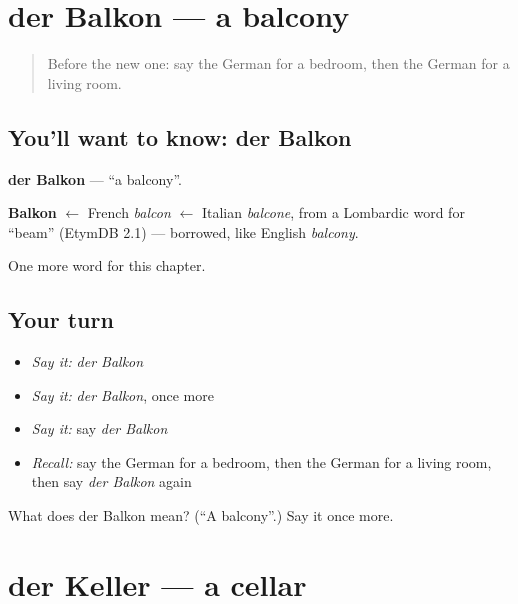 \section[der Balkon]{der Balkon — a balcony}

\label{lesson:GE-C161-balkon}



\begin{quote}
Before the new one: say the German for a bedroom, then the German for a living room.
\end{quote}

\subsection*{You'll want to know: der Balkon}
\textbf{der Balkon} — \textquotedblleft{}a balcony\textquotedblright{}.

\begin{cousinweb}
\textbf{Balkon} $\leftarrow$ French \emph{balcon} $\leftarrow$ Italian \emph{balcone}, from a Lombardic word for \textquotedblleft{}beam\textquotedblright{} (EtymDB 2.1) — borrowed, like English \emph{balcony}.
\end{cousinweb}

\begin{grammarlens}[title={What you've built}]
One more word for this chapter.
\end{grammarlens}

\subsection*{Your turn}
\begin{itemize}
\raggedright
  \item \emph{Say it:} \emph{der Balkon}
  \item \emph{Say it:} \emph{der Balkon}, once more
  \item \emph{Say it:} say \emph{der Balkon}
  \item \emph{Recall:} say the German for a bedroom, then the German for a living room, then say \emph{der Balkon} again
\end{itemize}

\begin{tcolorbox}[breakable,colback=teal!4,colframe=teal!35!black,title={Before you move on}]
What does der Balkon mean? (\textquotedblleft{}A balcony\textquotedblright{}.) Say it once more.
\end{tcolorbox}
\section[der Keller]{der Keller — a cellar}

